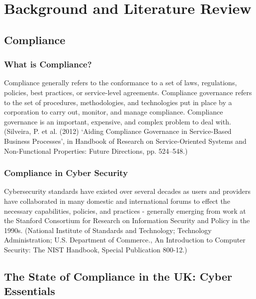\chapter{Background and Literature Review} \label{Chapter:two}


\section{Compliance}

    \subsection{What is Compliance?}
        Compliance generally refers to the conformance to a set of laws, regulations, policies, best practices, or service-level agreements. Compliance governance refers to the set of procedures, methodologies, and technologies put in place by a corporation to carry out, monitor, and manage compliance. Compliance governance is an important, expensive, and complex problem to deal with. (Silveira, P. et al. (2012) ‘Aiding Compliance Governance in Service-Based Business Processes’, in Handbook of Research on Service-Oriented Systems and Non-Functional Properties: Future Directions, pp. 524–548.)

    \subsection{Compliance in Cyber Security}
        Cybersecurity standards have existed over several decades as users and providers have collaborated in many domestic and international forums to effect the necessary capabilities, policies, and practices - generally emerging from work at the Stanford Consortium for Research on Information Security and Policy in the 1990s. (National Institute of Standards and Technology; Technology Administration; U.S. Department of Commerce., An Introduction to Computer Security: The NIST Handbook, Special Publication 800-12.)


\section{The State of Compliance in the UK: Cyber Essentials}

